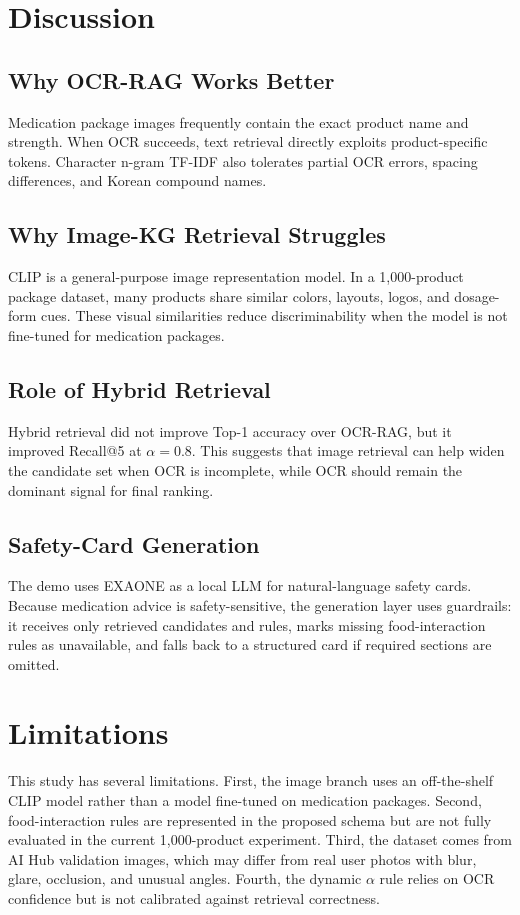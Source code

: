 \documentclass[sigconf,screen,nonacm]{acmart}
\begin{document}
\section{Discussion}
\subsection{Why OCR-RAG Works Better}
Medication package images frequently contain the exact product name and strength. When OCR succeeds, text retrieval directly exploits product-specific tokens. Character n-gram TF-IDF also tolerates partial OCR errors, spacing differences, and Korean compound names.

\subsection{Why Image-KG Retrieval Struggles}
CLIP is a general-purpose image representation model. In a 1,000-product package dataset, many products share similar colors, layouts, logos, and dosage-form cues. These visual similarities reduce discriminability when the model is not fine-tuned for medication packages.

\subsection{Role of Hybrid Retrieval}
Hybrid retrieval did not improve Top-1 accuracy over OCR-RAG, but it improved Recall@5 at $\alpha=0.8$. This suggests that image retrieval can help widen the candidate set when OCR is incomplete, while OCR should remain the dominant signal for final ranking.

\subsection{Safety-Card Generation}
The demo uses EXAONE as a local LLM for natural-language safety cards. Because medication advice is safety-sensitive, the generation layer uses guardrails: it receives only retrieved candidates and rules, marks missing food-interaction rules as unavailable, and falls back to a structured card if required sections are omitted.

\section{Limitations}
This study has several limitations. First, the image branch uses an off-the-shelf CLIP model rather than a model fine-tuned on medication packages. Second, food-interaction rules are represented in the proposed schema but are not fully evaluated in the current 1,000-product experiment. Third, the dataset comes from AI Hub validation images, which may differ from real user photos with blur, glare, occlusion, and unusual angles. Fourth, the dynamic $\alpha$ rule relies on OCR confidence but is not calibrated against retrieval correctness.
\end{document}
